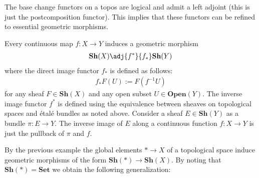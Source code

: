    \begin{property}
        The base change functors on a topos are logical and admit a left adjoint (this is just the postcomposition functor). This implies that these functors can be refined to essential geometric morphisms.
    \end{property}

    \begin{example}
        Every continuous map $f:X\rightarrow Y$ induces a geometric morphism
        \begin{gather}
            \mathbf{Sh}(X)\adj{f^*}{f_*}\mathbf{Sh}(Y)
        \end{gather}
        where the direct image functor $f_*$ is defined as follows:
        \begin{gather}
            f_*F(U) := F(f^{-1}U)
        \end{gather}
        for any sheaf $F\in\mathbf{Sh}(X)$ and any open subset $U\in\mathbf{Open}(Y)$. The inverse image functor $f^*$ is defined using the equivalence between sheaves on topological spaces and \'etal\'e bundles as noted above. Consider a sheaf $E\in\mathbf{Sh}(Y)$ as a bundle $\pi:E\rightarrow Y$. The inverse image of $E$ along a continuous function $f:X\rightarrow Y$ is just the pullback of $\pi$ and $f$.
    \end{example}

    By the previous example the global elements $\ast\rightarrow X$ of a topological space induce geometric morphisms of the form $\mathbf{Sh}(\ast)\rightarrow\mathbf{Sh}(X)$. By noting that $\mathbf{Sh}(\ast)=\mathbf{Set}$ we obtain the following generalization:


